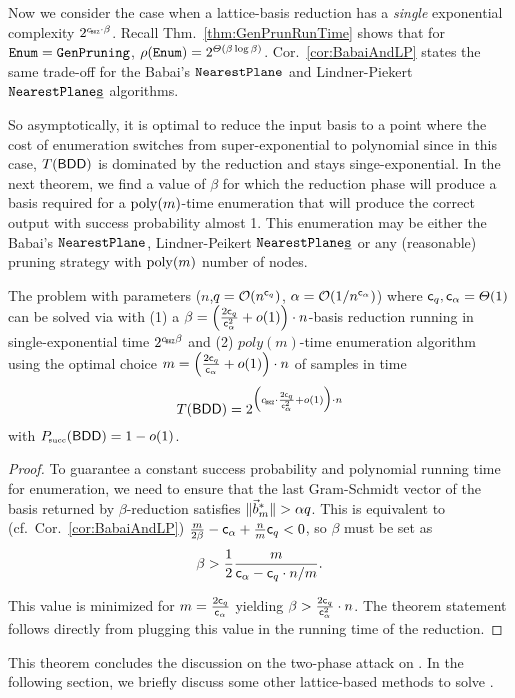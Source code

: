 Now we consider the case when a lattice-basis reduction has a \emph{single} exponential complexity $2^{\cBKZ \cdot \beta}$. Recall Thm.~\ref{thm:GenPrunRunTime} shows that for $\texttt{Enum} =  \texttt{GenPruning}$, $\rho(\texttt{Enum}) = 2^{\varTheta(\beta \log \beta)}$. Cor.~\ref{cor:BabaiAndLP} states the same trade-off for the Babai's $\texttt{NearestPlane}$ and Lindner-Piekert $\texttt{NearestPlane\underline{s}}$ algorithms.

So asymptotically, it is optimal to reduce the input basis to a point where the cost of enumeration switches from super-exponential to polynomial since in this case, $T(\textsf{BDD})$ is dominated by the reduction and stays singe-exponential. In the next theorem, we find a value of $\beta$ for which the reduction phase will produce a basis required for a $\mathrm{poly}(m)$-time enumeration that will produce the correct output with success probability almost 1. This enumeration may be either the Babai's $\texttt{NearestPlane}$, Lindner-Peikert $\texttt{NearestPlane\underline{s}}$ or any (reasonable) pruning strategy with $\mathrm{poly}(m)$ number of nodes. 

\begin{thm} \label{thm:BalanceSingleExp}
	The \LWE problem with parameters ($n$,\linebreak $q=\mathcal{O}(n^{\mathsf{c}_q})$, $\alpha = \mathcal{O}(1 / n^{\mathsf{c}_{\alpha}}) $) where $\mathsf{c}_q, \mathsf{c}_{\alpha} = \varTheta(1)$ can be solved via \BDD with (1) a $\beta= \Bigl( \frac{2 \mathsf{c}_q}{\mathsf{c}_{\alpha}^2} + o(1) \Bigr) \cdot n$-basis reduction running in single-exponential time $2^{\cBKZ \beta}$ and (2) $poly(m)$-time enumeration algorithm using the optimal choice $m = \left( \frac{2 \mathsf{c}_q}{\mathsf{c}_{\alpha}} + o(1) \right) \cdot n$ of samples in time
	\[
		T(\BDD) = 2^{ \Bigl(\cBKZ \cdot \frac{2 \cq}{\ca^2} + \smallo(1) \Bigr) \cdot n}
	\]
	with $P\mkern-4mu_{\mbox{\tiny succ}}(\textsf{BDD}) = 1 - o(1)$.
\end{thm}

\begin{proof}
 To guarantee a constant success probability and polynomial running time for enumeration, we need to ensure that the last Gram-Schmidt vector of the basis returned by $\beta$-reduction satisfies $\|  \vec b^*_m\| > \alpha q$. This is equivalent to (cf.\ Cor.~\ref{cor:BabaiAndLP}) $\frac{m}{2 \beta} - \mathsf{c}_{\alpha} + \frac{n}{m}\mathsf{c}_q  < 0$, so $\beta$ must be set as
 \[
 	\beta > \frac{1}{2} \frac{m}{\mathsf{c}_{\alpha} - \mathsf{c}_q \cdot n/m}. 
 \]
 
 This value is minimized for $m = \frac{2 \mathsf{c}_q}{\mathsf{c}_{\alpha}}$ yielding $\beta > \frac{2 \mathsf{c}_q}{\mathsf{c}_{\alpha}^2} \cdot n$. The theorem statement follows directly from plugging this value in the running time of the reduction. 
\end{proof}

This theorem concludes the discussion on the two-phase \BDD attack on \LWE. In the following section, we briefly discuss some other lattice-based methods to solve \LWE.